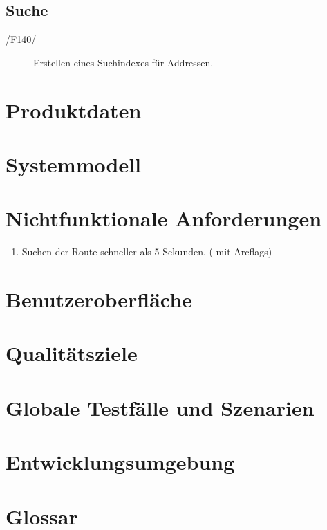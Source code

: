 \documentclass[a4paper, 11pt]{article}
\begin{document}
\subsection{Suche}
\begin{description}
\item[/F140/]
Erstellen eines Suchindexes für Addressen.

\end{description}
\section{Produktdaten}
\section{Systemmodell}
\section{Nichtfunktionale Anforderungen}

\begin{enumerate}
\item Suchen der Route schneller als 5 Sekunden. (  mit Arcflags)

\end{enumerate}
\section{Benutzeroberfläche}
\section{Qualitätsziele}
\section{Globale Testfälle und Szenarien}

\section{Entwicklungsumgebung}
\section{Glossar}
\end{document}
